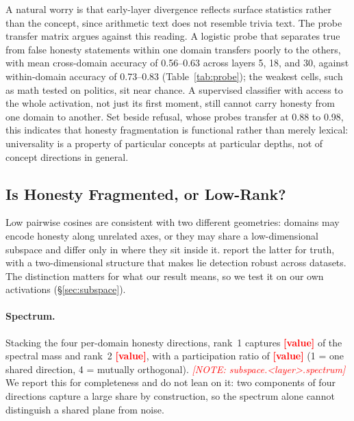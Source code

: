 \documentclass[11pt]{article}
\newcommand{\PH}[1]{\textcolor{red}{\textbf{[#1]}}}
\newcommand{\phnote}[1]{\textcolor{red}{\footnotesize\textit{[NOTE: #1]}}}
\begin{document}
A natural worry is that early-layer divergence reflects surface statistics
rather than the concept, since arithmetic text does not resemble trivia
text. The probe transfer matrix argues against this reading. A logistic
probe that separates true from false honesty statements within one domain
transfers poorly to the others, with mean cross-domain accuracy of
0.56--0.63 across layers 5, 18, and 30, against within-domain accuracy of
0.73--0.83 (Table~\ref{tab:probe}); the weakest cells, such as math tested on
politics, sit near chance. A supervised classifier with access to the whole
activation, not just its first moment, still cannot carry honesty from one
domain to another. Set beside refusal, whose probes transfer at 0.88 to 0.98,
this indicates that honesty fragmentation is functional rather than merely
lexical: universality is a property of particular concepts at particular
depths, not of concept directions in general.

\subsection{Is Honesty Fragmented, or Low-Rank?}
\label{sec:results-subspace}

%

Low pairwise cosines are consistent with two different geometries: domains may
encode honesty along unrelated axes, or they may share a low-dimensional
subspace and differ only in where they sit inside it. \citet{burger2024truth}
report the latter for truth, with a two-dimensional structure that makes lie
detection robust across datasets. The distinction matters for what our result
means, so we test it on our own activations (\S\ref{sec:subspace}).

\paragraph{Spectrum.}
Stacking the four per-domain honesty directions, rank~1 captures \PH{value} of
the spectral mass and rank~2 \PH{value}, with a participation ratio of
\PH{value} (1 = one shared direction, 4 = mutually orthogonal).
\phnote{subspace.<layer>.spectrum} We report this for completeness and do not
lean on it: two components of four directions capture a large share by
construction, so the spectrum alone cannot distinguish a shared plane from
noise.
\end{document}
